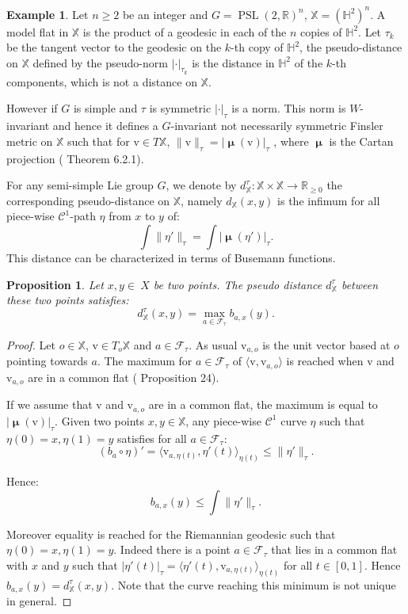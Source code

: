 \documentclass[reqno,10pt]{amsart}
\theoremstyle{plain}
\newtheorem{prop}[thm]{Proposition}
\theoremstyle{definition}
\newtheorem{exmp}[thm]{Example}
\theoremstyle{remark}
\newcommand{\type}{\tau}
\newcommand{\R}{\mathbb{R}}
\DeclareMathOperator{\Cartan}{\boldsymbol{\mu}}
\DeclareMathOperator{\PSL}{PSL}
\newcommand{\X}{\mathbb{X}}
\newcommand{\ie}{namely }
\begin{document}
\begin{exmp}
Let $n\geq 2$ be an integer and $G=\PSL(2,\R)^n$, $\X=\left(\mathbb{H}^2\right)^n$. A model flat in $\X$ is the product of a geodesic in each of the $n$ copies of $\mathbb{H}^2$. Let $\type_k$ be the tangent vector to the geodesic on the $k$-th copy of $\mathbb{H}^2$, the pseudo-distance on $\X$ defined by the pseudo-norm $|\cdot|_{\type_k}$ is the distance in $\mathbb{H}^2$ of the $k$-th components, which is not a distance on $\X$.
\end{exmp}

However if $G$ is simple and $\type$ is symmetric $|\cdot|_\type$ is a norm. This norm is $W$-invariant and hence it defines a $G$-invariant not necessarily symmetric Finsler metric on $\X$ such that for $\mathrm{v}\in T\X$, $\lVert\mathrm{v}\rVert_\type=|\Cartan(\mathrm{v})|_\type$ , where $\Cartan$ is the Cartan projection (\cite{Finsler} Theorem 6.2.1). 

\medskip

For any semi-simple Lie group $G$, we denote by $d^\type_\X:\X\times \X\to \R_{\geq 0}$ the corresponding pseudo-distance on $\X$, \ie $d_\X(x,y)$ is the infimum for all piece-wise $\mathcal{C}^1$-path $\eta$ from $x$ to $y$ of:
 $$\int \lVert\eta'\rVert_\type=\int |\Cartan(\eta')|_\type.$$
  This distance can be characterized in terms of Busemann functions.

\begin{prop}
\label{prop:defNorm}
Let $x,y\in \
X$ be two points. The pseudo distance $d^\type_\X$ between these two points satisfies:
$$d^\type_\X(x,y)=\max_{a\in \mathcal{F}_\type}b_{a,x}(y).$$
\end{prop}

\begin{proof}
Let $o\in \X$, $\mathrm{v}\in  T_o\X$ and $a\in \mathcal{F}_\type$. As usual $\mathrm{v}_{a,o}$ is the unit vector based at $o$ pointing towards $a$. The maximum for $a\in \mathcal{F}_\type$ of $\langle \mathrm{v},\mathrm{v}_{a,o}\rangle$ is reached when $\mathrm{v}$ and $\mathrm{v}_{a,o}$ are in a common flat (\cite{Eberlein} Proposition 24).

\medskip

If we assume that $\mathrm{v}$ and $\mathrm{v}_{a,o}$ are in a common flat, the maximum is equal to $|\Cartan(\mathrm{v})|_\type$. Given two points $x,y\in \X$, any piece-wise $\mathcal{C}^1$ curve $\eta$ such that $\eta(0)=x, \eta(1)=y$ satisfies  for all $a\in \mathcal{F}_\type$:
$$(b_a\circ \eta)'=\langle\mathrm{v}_{a,\eta(t)},\eta'(t)\rangle_{\eta(t)}\leq \lVert\eta'\rVert_\type.$$

Hence:
 $$b_{a,x}(y)\leq \int \lVert\eta'\rVert_\type.$$
 
Moreover equality is reached for the Riemannian geodesic such that $\eta(0)=x, \eta(1)=y$. Indeed there is a point $a\in \mathcal{F}_\type$ that lies in a common flat with $x$ and $y$ such that $|\eta'(t)|_\type=\langle \eta'(t),\mathrm{v}_{a,\eta(t)} \rangle_{\eta(t)}$ for all $t\in [0,1]$. Hence $b_{a,x}(y)=d^\type_\X(x,y)$. Note that the curve reaching this minimum is not unique in general. %
\end{proof}
\end{document}
